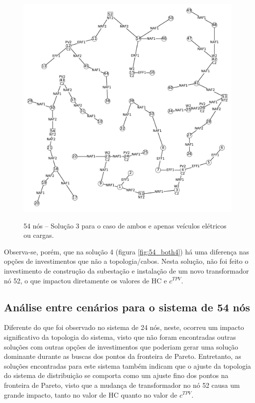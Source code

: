 \begin{figure}[ht]
 	\centering
    \caption{54 nós -- Solução 3 para o caso de ambos e apenas veículos elétricos ou cargas.}
    \includegraphics[width=1.02\textwidth]{cap4/resultados/54_bus_both3.pdf}\\
    \label{fig:54_both3}
\end{figure}

Observa-se, porém, que na solução 4 (figura \ref{fig:54_both4}) há uma diferença nas opções de investimentos que não a topologia/cabos. Nesta solução, não foi feito o investimento de construção da subestação e instalação de um novo transformador nó 52, o que impactou diretamente os valores de \ac{HC} e $c^{TPV}$. 

\subsection{Análise entre cenários para o sistema de 54 nós}

Diferente do que foi observado no sistema de 24 nós, neste, ocorreu um impacto significativo da topologia do sistema, visto que não foram encontradas outras soluções com outras opções de investimentos que poderiam gerar uma solução dominante durante as buscas dos pontos da fronteira de Pareto. Entretanto, as soluções encontradas para este sistema também indicam que o ajuste da topologia do sistema de distribuição se comporta como um ajuste fino dos pontos na fronteira de Pareto, visto que a mudança de transformador no nó 52 causa um grande impacto, tanto no valor de \ac{HC} quanto no valor de $c^{TPV}$.

